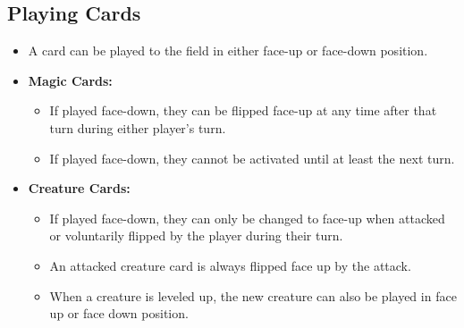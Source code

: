 \subsection{Playing Cards}
\begin{itemize}
    \item A card can be played to the field in either face-up or face-down position.
    \item \textbf{Magic Cards:}
    \begin{itemize}
        \item If played face-down, they can be flipped face-up at any time after that turn during either player's turn.
        \item If played face-down, they cannot be activated until at least the next turn.
    \end{itemize}
    \item \textbf{Creature Cards:}
    \begin{itemize}
        \item If played face-down, they can only be changed to face-up when attacked or voluntarily flipped by the player during their turn.
        \item An attacked creature card is always flipped face up by the attack.
        \item When a creature is leveled up, the new creature can also be played in face up or face down position.
    \end{itemize}
\end{itemize}






